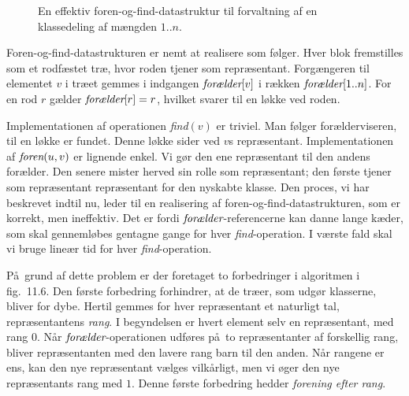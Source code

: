 \begin{figure}
%
  \caption{En effektiv foren-og-find-datastruktur til forvaltning af en klassedeling af mængden $1..n$.}
\end{figure}

Foren-og-find-datastrukturen er nemt at realisere som følger.
Hver blok fremstilles som et rodfæstet træ, hvor roden tjener som repræsentant.
Forgængeren til elementet $v$ i træet gemmes i indgangen $\operatorname{\emph{forælder}}[v]$ i rækken $\operatorname{\emph{forælder}}[1..n]$.
For en rod $r$ gælder $\operatorname{\emph{forælder}}[r]=r$, hvilket svarer til en løkke ved roden.
 
Implementationen af operationen \emph{find}$(v)$ er triviel.
Man følger forælderviseren, til en løkke er fundet.
Denne løkke sider ved $v$s repræsentant.
Implementationen af $\operatorname{\emph{foren}}(u,v)$ er lignende enkel.
Vi gør den ene repræsentant til den andens forælder.
Den senere mister herved sin rolle som repræsentant; den første tjener som repræsentant repræsentant for den nyskabte klasse.
Den proces, vi har beskrevet indtil nu, leder til en realisering af foren-og-find-datastrukturen, som er korrekt, men ineffektiv.
Det er fordi $\operatorname{\emph{forælder}}$-referencerne kan danne lange kæder, som skal gennemløbes gentagne gange for hver \emph{find}-operation.
I værste fald skal vi bruge lineær tid for hver \emph{find}-operation.

På grund af dette problem er der foretaget to forbedringer i algoritmen i fig.~11.6.
Den første forbedring forhindrer, at de træer, som udgør klasserne, bliver for dybe.
Hertil gemmes for hver repræsentant et naturligt tal, repræsentantens \emph{rang}.
I begyndelsen er hvert element selv en repræsentant, med rang $0$.
Når $\operatorname{\emph{forælder}}$-operationen udføres på to repræsentanter af forskellig rang, bliver repræsentanten med den lavere rang barn til den anden.
Når rangene er ens, kan den nye repræsentant vælges vilkårligt, men vi øger den nye repræsentants rang med $1$.
Denne første forbedring hedder \emph{forening efter rang}.

